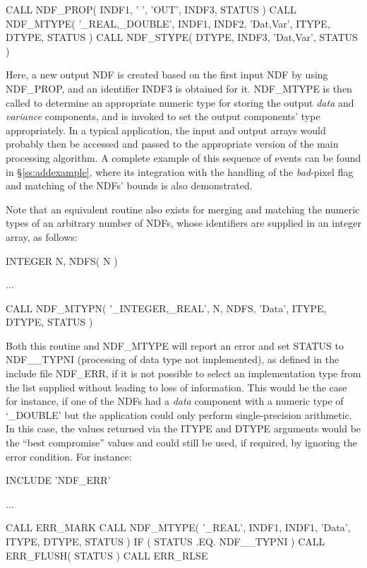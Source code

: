\documentclass[twoside,11pt,nolof]{starlink}
\providecommand{\st}[1]{{\emph{#1}}}
\begin{document}
\small
\begin{terminalv}
      CALL NDF_PROP( INDF1, ' ', 'OUT', INDF3, STATUS )
      CALL NDF_MTYPE( '_REAL,_DOUBLE', INDF1, INDF2, 'Dat,Var', ITYPE, DTYPE, STATUS )
      CALL NDF_STYPE( DTYPE, INDF3, 'Dat,Var', STATUS )
\end{terminalv}
\normalsize

Here, a new output NDF is created based on the first input NDF by using
NDF\_PROP, and an identifier INDF3 is obtained for it.
NDF\_MTYPE is then called to determine an appropriate numeric type for
storing the output \st{data\/} and \st{variance\/} components, and 
is invoked to set the output components' type appropriately.
In a typical application, the input and output arrays would probably then be
accessed and passed to the appropriate version of the main processing
algorithm.
A complete example of this sequence of events can be found in
\S\ref{ss:addexample}, where its integration with the handling of the
\st{bad\/}-pixel flag and matching of the NDFs' bounds is also
demonstrated.

Note that an equivalent routine  also exists for merging and
matching the numeric types of an arbitrary number of NDFs, whose identifiers
are supplied in an integer array, as follows:

\small
\begin{terminalv}
      INTEGER N, NDFS( N )

      ...

      CALL NDF_MTYPN( '_INTEGER,_REAL', N, NDFS, 'Data', ITYPE, DTYPE, STATUS )
\end{terminalv}
\normalsize

Both this routine and NDF\_MTYPE will report an error and set STATUS to
NDF\_\_TYPNI (processing of data type not implemented), as defined in the
include file NDF\_ERR, if it is not possible to select an implementation
type from the list supplied without leading to loss of information.
This would be the case for instance, if one of the NDFs had a \st{data\/}
component with a numeric type of `\_DOUBLE' but the application could only
perform single-precision arithmetic.
In this case, the values returned via the ITYPE and DTYPE arguments would be
the ``best compromise'' values and could still be used, if required, by
ignoring the error condition.
For instance:

\small
\begin{terminalv}
      INCLUDE 'NDF_ERR'

      ...

      CALL ERR_MARK
      CALL NDF_MTYPE( '_REAL', INDF1, INDF1, 'Data', ITYPE, DTYPE, STATUS )
      IF ( STATUS .EQ. NDF__TYPNI ) CALL ERR_FLUSH( STATUS )
      CALL ERR_RLSE
\end{terminalv}
\normalsize
\end{document}
